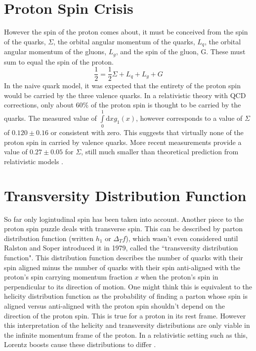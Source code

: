 \documentclass[abstract = on,listof=totoc, bibliography=totoc]{scrreprt}
\begin{document}
\section{Proton Spin Crisis}
However the spin of the proton comes about, it must be conceived from the spin of the quarks, $\Sigma$, the orbital angular momentum of the quarks, $L_q$, the orbital angular momentum of the gluons, $L_g$, and the spin of the gluon, G. These must sum to equal the spin of the proton.
\begin{equation}
\frac{1}{2} = \frac{1}{2}\Sigma + L_q + L_g + G
\end{equation}
In the naive quark model, it was expected that the entirety of the proton spin would be carried by the three valence quarks. In a relativistic theory with QCD corrections, only about 60\% of the proton spin is thought to be carried by the quarks. The measured value of $\int\limits_0^1 \text{d}x g_1(x)$, however corresponds to a value of $\Sigma$ of $0.120 \pm 0.16$ or consistent with zero. This suggests that virtually none of the proton spin in carried by valence quarks. More recent measurements provide a value of $0.27\pm 0.05$ for $\Sigma$, still much smaller than theoretical prediction from relativistic models \cite{jaffeWhereSpinComeFrom}. 

\section{Transversity Distribution Function}
So far only logintudinal spin has been taken into account. Another piece to the proton spin puzzle deals with transverse spin. This can be described by parton distribution function (written $h_1$ or $\Delta_T f$), which wasn't even considered until Ralston and Soper introduced it in 1979\cite{transIntroduced}, called the ``transversity distribution function". This distribution function describes the number of quarks with their spin aligned minus the number of quarks with their spin anti-aligned with the proton's spin carrying momentum fraction $x$ when the proton's spin in perpendicular to its direction of motion. One might think this is equivalent to the helicity distribution function as the probability of finding a parton whose spin is aligned versus anti-aligned with the proton spin shouldn't depend on the direction of the proton spin. This is true for a proton in its rest frame. However this interpretation of the helicity and transversity distributions are only viable in the infinite momentum frame of the proton. In a relativistic setting such as this, Lorentz boosts cause these distributions to differ \cite{BacchettaThesis}.   
\end{document}
